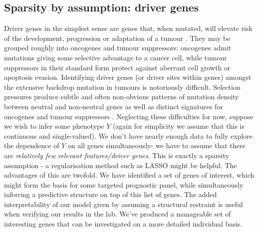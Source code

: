 \documentclass[thesis.tex]{subfiles}
\begin{document}
\subsection{Sparsity by assumption: driver genes}
Driver genes in the simplest sense are genes that, when mutated, will elevate risk of the development, progression or adaptation of a tumour \citep{hanahan_hallmarks_2000, hanahan_hallmarks_2011}. They may be grouped roughly into oncogenes and tumour suppressors: oncogenes admit mutations giving some selective advantage to a cancer cell, while tumour suppressors in their standard form protect against aberrant cell growth or apoptosis evasion. Identifying driver genes (or driver sites within genes) amongst the extensive backdrop mutation in tumours is notoriously difficult. Selection pressures produce subtle and often non-obvious patterns of mutation density between neutral and non-neutral genes as well as distinct signatures for oncogenes and tumour suppressors \citep{brown_finding_2019}. Neglecting these difficulties for now, suppose we wish to infer some phenotype $Y$ (again for simplicity we assume that this is continuous and single-valued). We don't have nearly enough data to fully explore the dependence of $Y$ on all genes simultaneously- we have to assume that there are \textit{relatively few relevant features/driver genes}. This is exactly a sparsity assumption - a regularisation method such as LASSO might be helpful. The advantages of this are twofold. We have identified a set of genes of interest, which might form the basis for some targeted prognostic panel, while simultaneously inferring a predictive structure on top of this list of genes. The added interpretability of our model given by assuming a structural restraint is useful when verifying our results in the lab. We've produced a manageable set of interesting genes that can be investigated on a more detailed individual basis.
\end{document}
